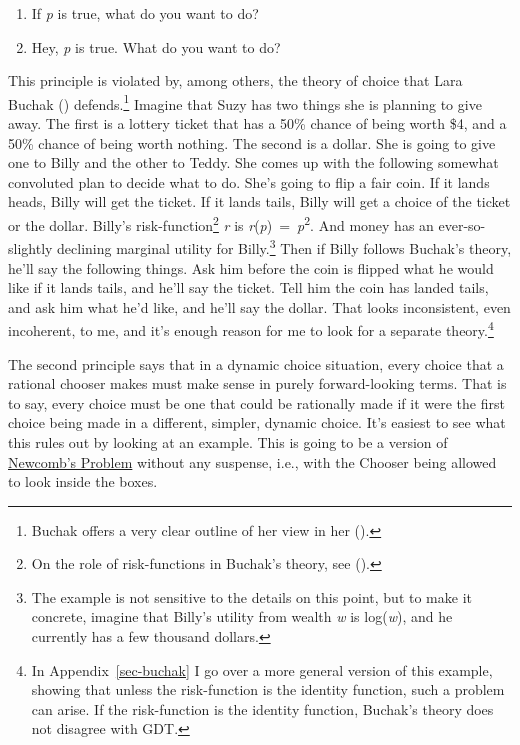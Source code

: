 \documentclass[
  12pt,
  letterpaper,
  DIV=11,
  numbers=noendperiod]{scrreprt}
\providecommand{\tightlist}{%
  \setlength{\itemsep}{0pt}\setlength{\parskip}{0pt}}\usepackage{longtable,booktabs,array}
\begin{document}
\begin{enumerate}
\def\labelenumi{\arabic{enumi}.}
\tightlist
\item
  If \emph{p} is true, what do you want to do?
\item
  Hey, \emph{p} is true. What do you want to do?
\end{enumerate}

This principle is violated by, among others, the theory of choice that
Lara Buchak () defends.\footnote{Buchak
  offers a very clear outline of her view in her
  ().} Imagine that Suzy has two things
she is planning to give away. The first is a lottery ticket that has a
50\% chance of being worth \$4, and a 50\% chance of being worth
nothing. The second is a dollar. She is going to give one to Billy and
the other to Teddy. She comes up with the following somewhat convoluted
plan to decide what to do. She's going to flip a fair coin. If it lands
heads, Billy will get the ticket. If it lands tails, Billy will get a
choice of the ticket or the dollar. Billy's risk-function\footnote{On
  the role of risk-functions in Buchak's theory, see
  ().} \emph{r} is
\emph{r}(\emph{p})~=~\emph{p}\textsuperscript{2}. And money has an
ever-so-slightly declining marginal utility for Billy.\footnote{The
  example is not sensitive to the details on this point, but to make it
  concrete, imagine that Billy's utility from wealth \emph{w} is
  log(\emph{w}), and he currently has a few thousand dollars.} Then if
Billy follows Buchak's theory, he'll say the following things. Ask him
before the coin is flipped what he would like if it lands tails, and
he'll say the ticket. Tell him the coin has landed tails, and ask him
what he'd like, and he'll say the dollar. That looks inconsistent, even
incoherent, to me, and it's enough reason for me to look for a separate
theory.\footnote{In Appendix~\ref{sec-buchak} I go over a more general
  version of this example, showing that unless the risk-function is the
  identity function, such a problem can arise. If the risk-function is
  the identity function, Buchak's theory does not disagree with GDT.}

The second principle says that in a dynamic choice situation, every
choice that a rational chooser makes must make sense in purely
forward-looking terms. That is to say, every choice must be one that
could be rationally made if it were the first choice being made in a
different, simpler, dynamic choice. It's easiest to see what this rules
out by looking at an example. This is going to be a version of
\hyperref[tbl-newcomb]{Newcomb's Problem} without any suspense, i.e.,
with the Chooser being allowed to look inside the boxes.
\end{document}
